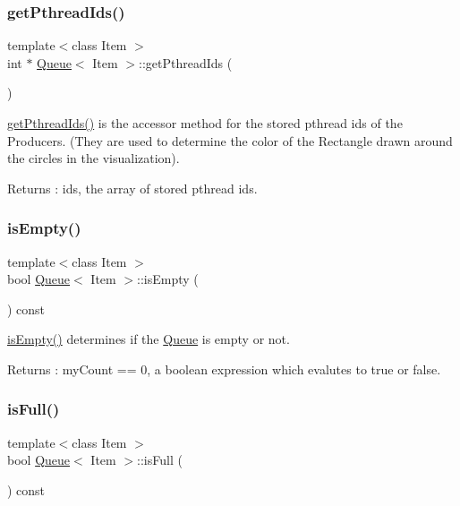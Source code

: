 \subsubsection{\texorpdfstring{get\+Pthread\+Ids()}{getPthreadIds()}}
{\footnotesize\ttfamily template$<$class Item $>$ \\
int $\ast$ \hyperlink{class_queue}{Queue}$<$ Item $>$\+::get\+Pthread\+Ids (\begin{DoxyParamCaption}{ }\end{DoxyParamCaption})}

\hyperlink{class_queue_a3b4fdca4e9907c895f77557a9c928524}{get\+Pthread\+Ids()} is the accessor method for the stored pthread ids of the Producers. (They are used to determine the color of the Rectangle drawn around the circles in the visualization). \begin{DoxyReturn}{Returns}
\+: ids, the array of stored pthread ids. 
\end{DoxyReturn}
\mbox{\label{class_queue_a8ce4be8838aeb2a8dd68f3bd96e78c94}} 
\subsubsection{\texorpdfstring{is\+Empty()}{isEmpty()}}
{\footnotesize\ttfamily template$<$class Item $>$ \\
bool \hyperlink{class_queue}{Queue}$<$ Item $>$\+::is\+Empty (\begin{DoxyParamCaption}{ }\end{DoxyParamCaption}) const}

\hyperlink{class_queue_a8ce4be8838aeb2a8dd68f3bd96e78c94}{is\+Empty()} determines if the \hyperlink{class_queue}{Queue} is empty or not. \begin{DoxyReturn}{Returns}
\+: my\+Count == 0, a boolean expression which evalutes to true or false. 
\end{DoxyReturn}
\mbox{\label{class_queue_a6d5941cebd6fe01ceefbe7138ff7f048}} 
\subsubsection{\texorpdfstring{is\+Full()}{isFull()}}
{\footnotesize\ttfamily template$<$class Item $>$ \\
bool \hyperlink{class_queue}{Queue}$<$ Item $>$\+::is\+Full (\begin{DoxyParamCaption}{ }\end{DoxyParamCaption}) const}

